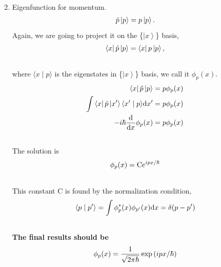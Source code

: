 \documentclass[letterpaper,10pt,english]{sphinxmanual}
\def\d{{\rm d}}
\newcommand{\bra}[1]{\left\langle #1\right|}
\newcommand{\ket}[1]{\left| #1\right\rangle}
\newcommand{\braket}[2]{\langle #1 \mid #2 \rangle}
\begin{document}
\begin{enumerate}
\begin{gather}
\end{gather}
\item {} 
Eigenfunction for momentum.
\begin{gather}
\begin{split}\hat p \ket{p} = p \ket{p} .\end{split}\notag
\end{gather}
Again, we are going to project it on the \{$\ket{x}$\} basis,
\begin{gather}
\begin{split}\bra{x}\hat p\ket{p} = \bra{x} p \ket{p} ,\end{split}\notag\\\begin{split}\end{split}\notag
\end{gather}
where $\braket{x}{p}$ is the eigenstates in \{$\ket{x}$\} basis, we call it $\phi_p(x)$.
\begin{gather}
\begin{split}\bra{x}\hat p\ket{p} & =  p \phi_p(x)    \\
\int \bra{x}\hat p \ket{x'}\braket{x'}{p}\d x' & =  p \phi_p(x)    \\
-i\hbar \frac{\d }{\d x} \phi_p(x) & =  p \phi_p(x)\end{split}\notag\\\begin{split}\end{split}\notag
\end{gather}
The solution is
\begin{gather}
\begin{split}\phi_p(x) = \mathrm{C} e^{i p x/\hbar}\end{split}\notag\\\begin{split}\end{split}\notag
\end{gather}
This constant C is found by the normalization condition,
\begin{gather}
\begin{split}\braket{p}{p'}=\int \phi_p^*(x)\phi_{p'}(x)\d x = \delta(p-p')\end{split}\notag\\\begin{split}\end{split}\notag
\end{gather}
\textbf{The final results should be}
\begin{gather}
\begin{split}\phi_p(x)=\frac{1}{\sqrt{2\pi \hbar}} \exp{(i p x/\hbar)}\end{split}\notag\\\begin{split}\end{split}\notag

\end{gather}
\end{enumerate}
\end{document}
